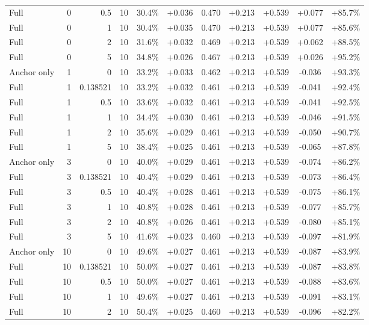 \begin{table}[htbp]
\begin{tabular}{lrrrccccccc}
Full & 0 & 0.5 & 10 & 30.4\% & +0.036 & 0.470 & +0.213 & +0.539 & +0.077 & +85.7\% \\
Full & 0 & 1 & 10 & 30.4\% & +0.035 & 0.470 & +0.213 & +0.539 & +0.077 & +85.6\% \\
Full & 0 & 2 & 10 & 31.6\% & +0.032 & 0.469 & +0.213 & +0.539 & +0.062 & +88.5\% \\
Full & 0 & 5 & 10 & 34.8\% & +0.026 & 0.467 & +0.213 & +0.539 & +0.026 & +95.2\% \\
Anchor only & 1 & 0 & 10 & 33.2\% & +0.033 & 0.462 & +0.213 & +0.539 & -0.036 & +93.3\% \\
Full & 1 & 0.138521 & 10 & 33.2\% & +0.032 & 0.461 & +0.213 & +0.539 & -0.041 & +92.4\% \\
Full & 1 & 0.5 & 10 & 33.6\% & +0.032 & 0.461 & +0.213 & +0.539 & -0.041 & +92.5\% \\
Full & 1 & 1 & 10 & 34.4\% & +0.030 & 0.461 & +0.213 & +0.539 & -0.046 & +91.5\% \\
Full & 1 & 2 & 10 & 35.6\% & +0.029 & 0.461 & +0.213 & +0.539 & -0.050 & +90.7\% \\
Full & 1 & 5 & 10 & 38.4\% & +0.025 & 0.461 & +0.213 & +0.539 & -0.065 & +87.8\% \\
Anchor only & 3 & 0 & 10 & 40.0\% & +0.029 & 0.461 & +0.213 & +0.539 & -0.074 & +86.2\% \\
Full & 3 & 0.138521 & 10 & 40.4\% & +0.029 & 0.461 & +0.213 & +0.539 & -0.073 & +86.4\% \\
Full & 3 & 0.5 & 10 & 40.4\% & +0.028 & 0.461 & +0.213 & +0.539 & -0.075 & +86.1\% \\
Full & 3 & 1 & 10 & 40.8\% & +0.028 & 0.461 & +0.213 & +0.539 & -0.077 & +85.7\% \\
Full & 3 & 2 & 10 & 40.8\% & +0.026 & 0.461 & +0.213 & +0.539 & -0.080 & +85.1\% \\
Full & 3 & 5 & 10 & 41.6\% & +0.023 & 0.460 & +0.213 & +0.539 & -0.097 & +81.9\% \\
Anchor only & 10 & 0 & 10 & 49.6\% & +0.027 & 0.461 & +0.213 & +0.539 & -0.087 & +83.9\% \\
Full & 10 & 0.138521 & 10 & 50.0\% & +0.027 & 0.461 & +0.213 & +0.539 & -0.087 & +83.8\% \\
Full & 10 & 0.5 & 10 & 50.0\% & +0.027 & 0.461 & +0.213 & +0.539 & -0.088 & +83.6\% \\
Full & 10 & 1 & 10 & 49.6\% & +0.027 & 0.461 & +0.213 & +0.539 & -0.091 & +83.1\% \\
Full & 10 & 2 & 10 & 50.4\% & +0.025 & 0.460 & +0.213 & +0.539 & -0.096 & +82.2\% \\

\end{tabular}
\end{table}
